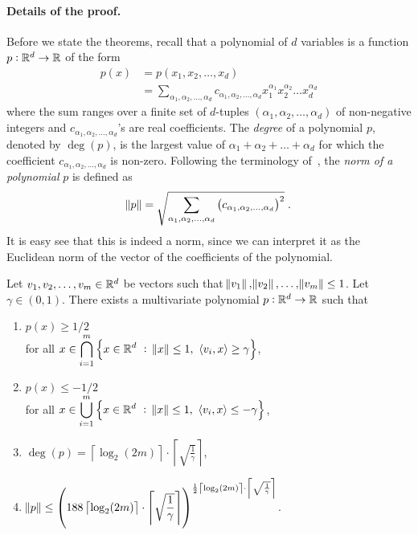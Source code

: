 \paragraph{Details of the proof.} Before we state the theorems, recall that a polynomial of $d$ variables is a
function $p:\mathbb{R}^d \to \mathbb{R}$ of the form
\begin{align*}
p(x)
& = p(x_1, x_2, \dots, x_d) \\
& = \sum_{\alpha_1, \alpha_2, \dots, \alpha_d} c_{\alpha_1, \alpha_2, \dots, \alpha_d} x_1^{\alpha_1} x_2^{\alpha_2} \dots x_d^{\alpha_d}
\end{align*}
where the sum ranges over a finite set of $d$-tuples $(\alpha_1, \alpha_2,
\dots, \alpha_d)$ of non-negative integers and $c_{\alpha_1, \alpha_2, \dots,
\alpha_d}$'s are real coefficients. The \emph{degree} of a polynomial $p$,
denoted by $\deg(p)$, is the largest value of $\alpha_1 + \alpha_2 + \dots +
\alpha_d$ for which the coefficient $c_{\alpha_1, \alpha_2, \dots, \alpha_d}$ is
non-zero. Following the terminology of~\citet{Klivans-Servedio-2008}, the
\emph{norm of a polynomial} $p$ is defined as
$$
\norm{p} = \sqrt{\sum_{\alpha_1, \alpha_2, \dots, \alpha_d} \left(c_{\alpha_1, \alpha_2, \dots, \alpha_d} \right)^2 } \; .
$$
It is easy see that this is indeed a norm, since we can interpret it as the
Euclidean norm of the vector of the coefficients of the polynomial.

\begin{theorem}
\label{theorem:polynomial-approximation-1}
Let $v_1, v_2, \dots, v_m \in \mathbb{R}^d$ be vectors such that $\norm{v_1},
\norm{v_2}, \dots, \norm{v_m} \le 1$. Let $\gamma \in (0,1)$. There exists a
multivariate polynomial $p:\mathbb{R}^d \to \mathbb{R}$ such that
\begin{enumerate}
\item $p(x) \ge 1/2$ \\ for all $\displaystyle x \in \bigcap_{i=1}^m \left\{ x \in \mathbb{R}^d ~:~ \norm{x} \le 1, \ \left\langle v_i, x \right\rangle \ge \gamma \right\}$,
\item $p(x) \le -1/2$ \\ for all $\displaystyle x \in \bigcup_{i=1}^m \left\{ x \in \mathbb{R}^d ~:~ \norm{x} \le 1, \ \left\langle v_i, x \right\rangle \le - \gamma \right\}$,
\item $\displaystyle \deg(p) = \left\lceil \log_2(2m) \right\rceil \cdot \left\lceil \sqrt{\frac{1}{\gamma}} \right\rceil$,
\item $\displaystyle \norm{p} \le \left( 188 \left\lceil \log_2(2m) \right\rceil \cdot \left\lceil \sqrt{\frac{1}{\gamma}} \right\rceil \right)^{\frac{1}{2} \left\lceil \log_2(2m) \right\rceil \cdot \left\lceil \sqrt{\frac{1}{\gamma}} \right\rceil}$.
\end{enumerate}
\end{theorem}

